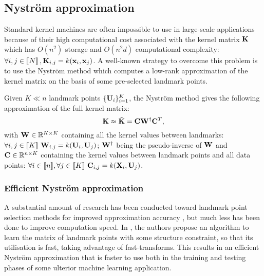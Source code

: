 \subsection{Nyström approximation}

Standard kernel machines are often impossible to use in large-scale applications because of their high computational cost associated with the kernel matrix ${\mathbf{K}}$ which has $O(n^2)$ storage and $O(n^2d)$ computational complexity: $\forall i,j \in\left \llbracket N\right \rrbracket, {\mathbf{K}}_{i,j} = k({\mathbf{x}}_i, {\mathbf{x}}_j)$. A well-known strategy to overcome this problem is to use the Nyström method which computes a low-rank approximation of the kernel matrix on the basis of some pre-selected landmark points. 

Given $K \ll n$ landmark points $\{{\mathbf{U}}_i\}_{i=1}^{K}$, the Nyström method gives the following approximation of the full kernel matrix:
%
\begin{equation}
 \label{eq:nystrom}
 {\mathbf{K}} \approx \tilde{{\mathbf{K}}} = {\mathbf{C}}{\mathbf{W}}^\dagger{\mathbf{C}}^T,
\end{equation}
%
with ${\mathbf{W}} \in \mathbb{R}^{K \times K}$ containing all the kernel values between landmarks: $\forall i,j \in [\![K]\!]~ {\mathbf{W}}_{i,j} = k({\mathbf{U}}_i, {\mathbf{U}}_j)$; ${\mathbf{W}}^\dagger$ being the pseudo-inverse of ${\mathbf{W}}$ and ${\mathbf{C}} \in \mathbb{R}^{n \times K}$ containing the kernel values between landmark points and all data points: $\forall i \in [\![n]\!], \forall j \in [\![K]\!]~ {\mathbf{C}}_{i, j} = k({\mathbf{X}}_i, {\mathbf{U}}_j)$.

\subsubsection{Efficient Nyström approximation}

A substantial amount of research has been conducted toward landmark point selection methods for improved approximation accuracy \cite{kumar2012sampling} \cite{musco2017recursive}, but much less has been done to improve computation speed. In \cite{si2016computationally}, the authors propose an algorithm to learn the matrix of landmark points with some structure constraint, so that its utilisation is fast, taking advantage of fast-transforms. This results in an efficient Nyström approximation that is faster to use both in the training and testing phases of some ulterior machine learning application.

